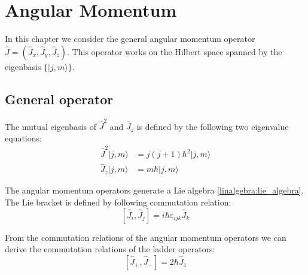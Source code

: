 \chapter{Angular Momentum}
	In this chapter we consider the general angular momentum operator $\hat{J} = \left(\hat{J}_x, \hat{J}_y, \hat{J}_z\right)$. This operator works on the Hilbert space spanned by the eigenbasis $\{|j, m\rangle\}$.

\section{General operator}
    
	\begin{property}
    		The mutual eigenbasis of $\hat{J}^2$ and $\hat{J}_z$ is defined by the following two eigenvalue equations:
        	\begin{align}
        		\label{QM:angular_momentum:j}
        		\hat{J}^2|j, m\rangle &= j(j+1)\hbar^2|j, m\rangle\\
        		\label{QM:angular_momentum:m}
        		\hat{J}_z|j, m\rangle &= m\hbar|j, m\rangle
	        \end{align}
	\end{property}

	\begin{property}
    		The angular momentum operators generate a Lie algebra \ref{linalgebra:lie_algebra}. The Lie bracket is defined by following commutation relation:
        	\begin{equation}
        		\label{QM:angular_momentum:commutation}
        		\boxed{\left[\hat{J}_i, \hat{J}_j\right] = i\hbar\varepsilon_{ijk}\hat{J}_k}
        	\end{equation}
	\end{property}
    
	\begin{result}
	    	From the commutation relations of the angular momentum operators we can derive the commutation relations of the ladder operators:
	        \begin{equation}
	        	\left[\hat{J}_+, \hat{J}_-\right] = 2\hbar\hat{J}_z
	        \end{equation}
	\end{result}
    
